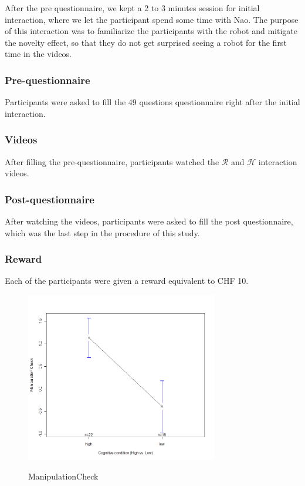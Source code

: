 \documentclass[a4,twocolumn,10pt]{article}
\begin{document}
After the pre questionnaire, we kept a 2 to 3 minutes session for initial
interaction, where we let the participant spend some time with Nao.
The purpose of this interaction was to familiarize the participants with the
robot and mitigate the novelty effect, so that they do not get surprised seeing
a robot for the first time in the videos.

\subsubsection{Pre-questionnaire}

Participants were asked to fill the 49 questions questionnaire right after the
initial interaction.

\subsubsection{Videos}

After filling the pre-questionnaire, participants watched the $\mathcal{R}$ and
$\mathcal{H}$ interaction videos.

\subsubsection{Post-questionnaire}

After watching the videos, participants were asked to fill the post
questionnaire, which was the last step in the procedure of this study.

\subsubsection{Reward}

Each of the participants were given a reward equivalent to CHF 10.

\begin{figure}
    {\includegraphics[width=3.3in]{ManipulationCheck}}
    \caption{ManipulationCheck}
    \label{fig:ManipulationCheck}
\end{figure}
\end{document}
